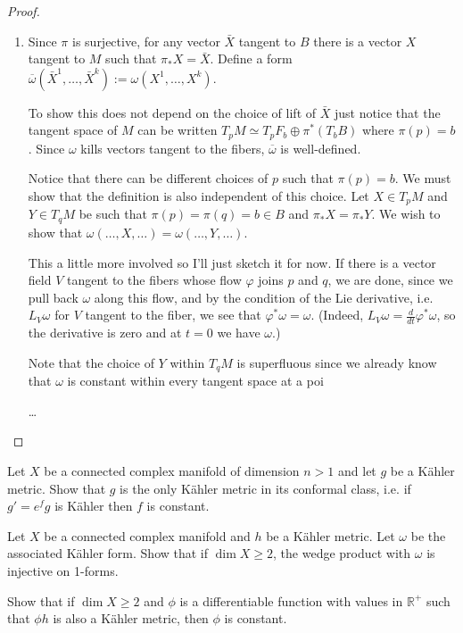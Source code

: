 \begin{proof}
\begin{enumerate}
\item Since $\pi$ is surjective, for any 
vector $\bar{X}$ tangent to $B$ there is
a vector $X$ tangent to $M$ such that $\pi_*X=\bar{X}$.
Define a form $\overline{\omega}(\bar{X}^1,…,\bar{X}^k):=
\omega(X^1,…,X^k)$.

To show this does not depend on the choice of lift of $\bar{X}$
just notice that the tangent space of $M$ can be written
$T_pM \simeq T_pF_b \oplus \pi^*(T_bB)$ where $\pi(p)=b$. 
Since $\omega$ kills vectors tangent to the fibers,
$\overline{\omega}$ is well-defined.

Notice that there can be different choices of $p$ such that
$\pi(p)=b$. We must show that the definition is also 
independent of this choice.
Let $X \in T_pM$ and $Y \in T_qM$ be such that
$\pi(p)=\pi(q)=b \in B$ and $\pi_*X=\pi_*Y$.
We wish to show that
$\omega(…,X,…)=\omega(…,Y,…)$.

This a little more involved so I'll just sketch it for now.
If there is a vector field $V$ tangent to the fibers
whose flow $\varphi$ joins $p$ and $q$, we are done,
since we pull back $\omega$ along this flow,
and by the condition of the Lie derivative, i.e. $L_V\omega$ for $V$
tangent to the fiber, we see that $\varphi^*\omega=\omega$.
(Indeed, $L_V\omega=\frac{d}{dt}\varphi^*\omega$,
so the derivative is zero and at $t=0$ we have $\omega$.)

Note that the choice of $Y$ within $T_qM$
is superfluous since we already know that $\omega$
is constant within every tangent space at a poi

…
\end{enumerate}
\end{proof}




\begin{exercise}
\label{exercise-kahler-form-conformal-class}
Let $X$ be a connected complex manifold of dimension $n>1$
and let $g$ be a Kähler metric.
Show that $g$ is the only Kähler metric in its conformal class,
i.e. if $g'=e^fg$ is Kähler then $f$ is constant.
\end{exercise}

\begin{exercise}
\label{exercise-lefschetz-injective-on-1-forms}
Let $X$ be a connected complex manifold and $h$ be a Kähler metric.
Let $\omega$ be the associated Kähler form.
Show that if $\dim X \geq  2$, the wedge product with $\omega$
is injective on 1-forms.

Show that if $\dim X \geq  2$ and $\phi$ is a differentiable
function with values in $\mathbb{R}^+$ such that $\phi h$ is also
a Kähler metric, then $\phi$ is constant.
\end{exercise}

